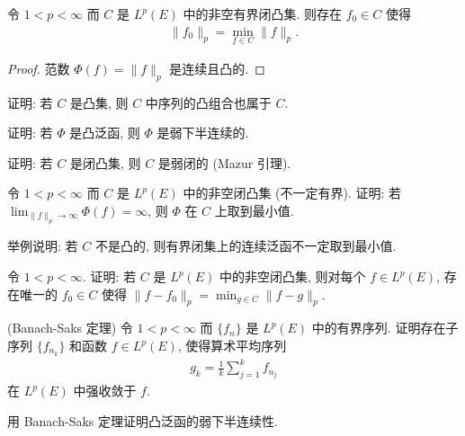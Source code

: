 \documentclass[../../main.tex]{subfiles}
\begin{document}
\begin{corollary}\label{corollary:ch08-范数最小化}
令 $1<p<\infty$ 而 $C$ 是 $L^{p}(E)$ 中的非空有界闭凸集. 则存在 $f_{0}\in C$ 使得
\begin{align*}
\|f_{0}\|_{p}=\min_{f\in C}\|f\|_{p}.
\end{align*}
\end{corollary}

\begin{proof}
范数 $\Phi(f)=\|f\|_{p}$ 是连续且凸的.
\end{proof}

\begin{exercise}\label{exercise:ch08-38}
证明: 若 $C$ 是凸集, 则 $C$ 中序列的凸组合也属于 $C$.
\end{exercise}

\begin{exercise}\label{exercise:ch08-39}
证明: 若 $\Phi$ 是凸泛函, 则 $\Phi$ 是弱下半连续的.
\end{exercise}

\begin{exercise}\label{exercise:ch08-40}
证明: 若 $C$ 是闭凸集, 则 $C$ 是弱闭的 (Mazur 引理).
\end{exercise}

\begin{exercise}\label{exercise:ch08-41}
令 $1<p<\infty$ 而 $C$ 是 $L^{p}(E)$ 中的非空闭凸集 (不一定有界). 证明: 若 $\lim_{\|f\|_{p}\to\infty}\Phi(f)=\infty$, 则 $\Phi$ 在 $C$ 上取到最小值.
\end{exercise}

\begin{exercise}\label{exercise:ch08-42}
举例说明: 若 $C$ 不是凸的, 则有界闭集上的连续泛函不一定取到最小值.
\end{exercise}

\begin{exercise}\label{exercise:ch08-43}
令 $1<p<\infty$. 证明: 若 $C$ 是 $L^{p}(E)$ 中的非空闭凸集, 则对每个 $f\in L^{p}(E)$, 存在唯一的 $f_{0}\in C$ 使得 $\|f-f_{0}\|_{p}=\min_{g\in C}\|f-g\|_{p}$.
\end{exercise}

\begin{exercise}\label{exercise:ch08-44}
(Banach-Saks 定理) 令 $1<p<\infty$ 而 $\{f_{n}\}$ 是 $L^{p}(E)$ 中的有界序列. 证明存在子序列 $\{f_{n_{k}}\}$ 和函数 $f\in L^{p}(E)$, 使得算术平均序列
\begin{align*}
g_{k}=\frac{1}{k}\sum_{j=1}^{k}f_{n_{j}}
\end{align*}
在 $L^{p}(E)$ 中强收敛于 $f$.
\end{exercise}

\begin{exercise}\label{exercise:ch08-45}
用 Banach-Saks 定理证明凸泛函的弱下半连续性.
\end{exercise}
\end{document}
